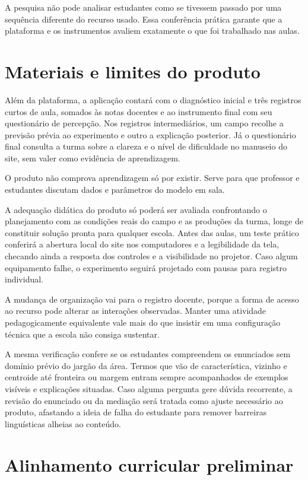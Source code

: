 A pesquisa não pode analisar estudantes como se tivessem passado por uma sequência diferente do recurso usado. Essa conferência prática garante que a plataforma e os instrumentos avaliem exatamente o que foi trabalhado nas aulas.

\section{Materiais e limites do produto}

Além da plataforma, a aplicação contará com o diagnóstico inicial e três registros curtos de aula, somados às notas docentes e ao instrumento final com seu questionário de percepção. Nos registros intermediários, um campo recolhe a previsão prévia ao experimento e outro a explicação posterior. Já o questionário final consulta a turma sobre a clareza e o nível de dificuldade no manuseio do site, sem valer como evidência de aprendizagem.

O produto não comprova aprendizagem só por existir. Serve para que professor e estudantes discutam dados e parâmetros do modelo em sala.

A adequação didática do produto só poderá ser avaliada confrontando o planejamento com as condições reais do campo e as produções da turma, longe de constituir solução pronta para qualquer escola. Antes das aulas, um teste prático conferirá a abertura local do site nos computadores e a legibilidade da tela, checando ainda a resposta dos controles e a visibilidade no projetor. Caso algum equipamento falhe, o experimento seguirá projetado com pausas para registro individual.

A mudança de organização vai para o registro docente, porque a forma de acesso ao recurso pode alterar as interações observadas. Manter uma atividade pedagogicamente equivalente vale mais do que insistir em uma configuração técnica que a escola não consiga sustentar.

A mesma verificação confere se os estudantes compreendem os enunciados sem domínio prévio do jargão da área. Termos que vão de característica, vizinho e centroide até fronteira ou margem entram sempre acompanhados de exemplos visíveis e explicações situadas. Caso alguma pergunta gere dúvida recorrente, a revisão do enunciado ou da mediação será tratada como ajuste necessário ao produto, afastando a ideia de falha do estudante para remover barreiras linguísticas alheias ao conteúdo.

\section{Alinhamento curricular preliminar}

